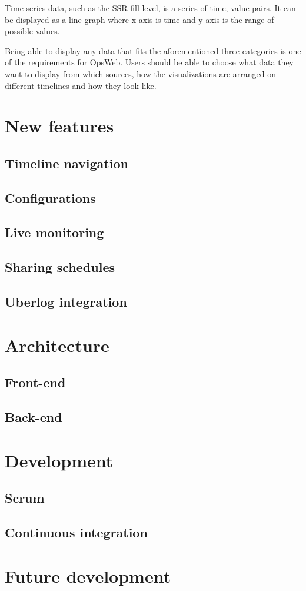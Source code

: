 Time series data, such as the SSR fill level, is a series of time, value pairs. It can be displayed as a line graph where x-axis is time and y-axis is the range of possible values.

Being able to display any data that fits the aforementioned three categories is one of the requirements for OpsWeb. Users should be able to choose what data they want to display from which sources, how the visualizations are arranged on different timelines and how they look like.

\section{New features}
\subsection{Timeline navigation}
\subsection{Configurations}
\subsection{Live monitoring}
\subsection{Sharing schedules}
\subsection{Uberlog integration}
\section{Architecture}
\subsection{Front-end}
\subsection{Back-end}
\section{Development}
\subsection{Scrum}
\subsection{Continuous integration}
\section{Future development}